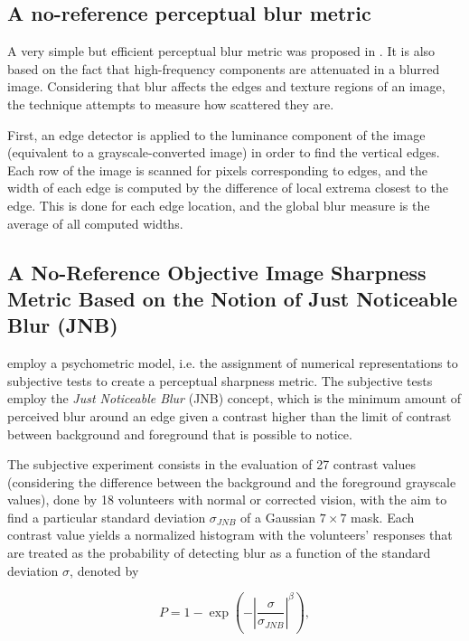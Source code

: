 \subsection{A no-reference perceptual blur metric}

A very simple but efficient perceptual blur metric was proposed in \cite{marziliano2002noreference}. It is also based on the fact that high-frequency components are attenuated in a blurred image. Considering that blur affects the edges and texture regions of an image, the technique attempts to measure how scattered they are. 

First, an edge detector is applied to the luminance component of the image (equivalent to a grayscale-converted image) in order to find the vertical edges. Each row of the image is scanned for pixels corresponding to edges, and the width of each edge is computed by the difference of local extrema closest to the edge. This is done for each edge location, and the global blur measure is the average of all computed widths.

\subsection{A No-Reference Objective Image Sharpness Metric Based on the Notion of Just Noticeable Blur (JNB)}
\label{subsec:jnb_approach}

 employ a psychometric model, i.e. the assignment of numerical representations to subjective tests to create a perceptual sharpness metric. The subjective tests employ the \emph{Just Noticeable Blur} (JNB) concept, which is the minimum amount of perceived blur around an edge given a contrast higher than the limit of contrast between background and foreground that is possible to notice. 

The subjective experiment consists in the evaluation of 27 contrast values (considering the difference between the background and the foreground grayscale values), done by 18 volunteers with normal or corrected vision, with the aim to find a particular standard deviation $\sigma_{JNB}$ of a Gaussian $7 \times 7$ mask. Each contrast value yields a normalized histogram with the volunteers' responses that are treated as the probability of detecting blur as a function of the standard deviation $\sigma$, denoted by

\begin{equation}
\label{eqn:psychometric_jnb}
P = 1 - \exp{\left( - \left| \frac{\sigma}{\sigma_{JNB} } \right|^{\beta} \right)},
\end{equation}

